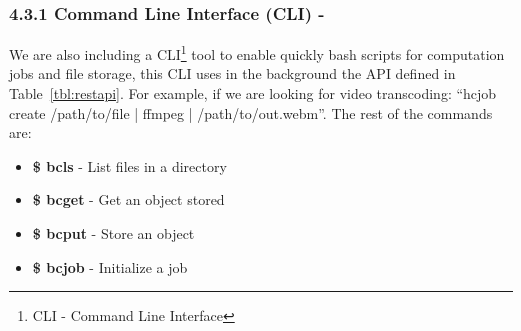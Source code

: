 \subsubsection{4.3.1 Command Line Interface (CLI) -}

We are also including a CLI\footnote{CLI - Command Line Interface} tool to enable quickly bash scripts for computation jobs and file storage, this CLI uses in the background the API defined in Table~\ref{tbl:restapi}. For example, if we are looking for video transcoding: ``hcjob create /path/to/file | ffmpeg | /path/to/out.webm''. The rest of the commands are:
  
\begin{itemize}
  \item \textbf{\$ bcls}  - List files in a directory
  \item \textbf{\$ bcget} - Get an object stored
  \item \textbf{\$ bcput} - Store an object
  \item \textbf{\$ bcjob} - Initialize a job   
\end{itemize} 

% 
% 